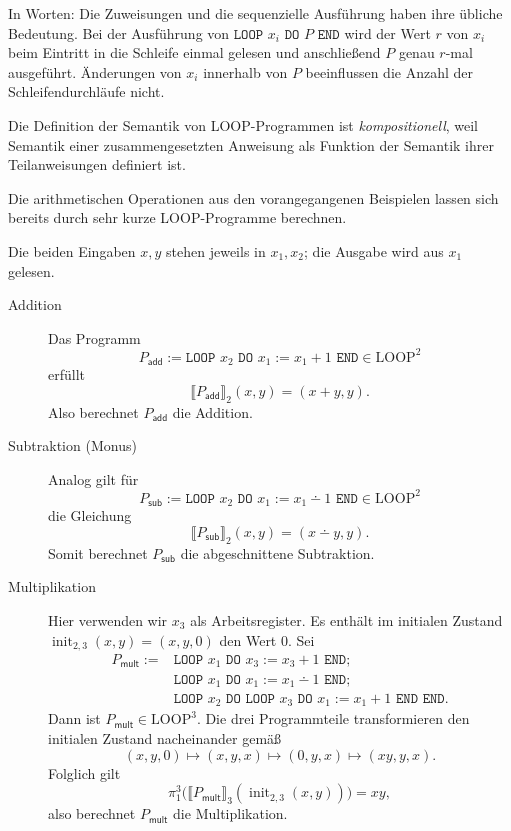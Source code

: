In Worten: Die Zuweisungen und die sequenzielle Ausführung haben ihre übliche
Bedeutung. Bei der Ausführung von
$\texttt{LOOP }x_i\texttt{ DO }P\texttt{ END}$ wird der Wert $r$ von $x_i$
beim Eintritt in die Schleife einmal gelesen und anschließend $P$ genau
$r$-mal ausgeführt. Änderungen von $x_i$ innerhalb von $P$ beeinflussen die
Anzahl der Schleifendurchläufe nicht.

Die Definition der Semantik von LOOP-Programmen ist
\emph{kompositionell}, weil Semantik einer zusammengesetzten Anweisung
als Funktion der Semantik ihrer Teilanweisungen definiert ist.

Die arithmetischen Operationen aus den vorangegangenen Beispielen lassen sich
bereits durch sehr kurze LOOP-Programme berechnen.
\begin{Bsp}
  Die beiden Eingaben $x,y$ stehen jeweils in $x_1,x_2$; die Ausgabe wird aus
  $x_1$ gelesen.
  \begin{description}
  \item[Addition]
    Das Programm
    \[
      P_{\mathsf{add}}
      :=\texttt{LOOP }x_2\texttt{ DO }x_1:=x_1+1\texttt{ END}
      \in\mathrm{LOOP}^2
    \]
    erfüllt
    \[
      \llbracket P_{\mathsf{add}}\rrbracket_2(x,y)=(x+y,y).
    \]
    Also berechnet $P_{\mathsf{add}}$ die Addition.

  \item[Subtraktion (Monus)]
    Analog gilt für
    \[
      P_{\mathsf{sub}}
      :=\texttt{LOOP }x_2\texttt{ DO }
        x_1:=x_1\dotminus1\texttt{ END}
      \in\mathrm{LOOP}^2
    \]
    die Gleichung
    \[
      \llbracket P_{\mathsf{sub}}\rrbracket_2(x,y)
      =(x\dotminus y,y).
    \]
    Somit berechnet $P_{\mathsf{sub}}$ die abgeschnittene Subtraktion.

  \item[Multiplikation]
    Hier verwenden wir $x_3$ als Arbeitsregister. Es enthält im initialen
    Zustand $\operatorname{init}_{2,3}(x,y)=(x,y,0)$ den Wert $0$. Sei
    \[
      \begin{aligned}
      P_{\mathsf{mult}}:={}&
        \texttt{LOOP }x_1\texttt{ DO }x_3:=x_3+1\texttt{ END};\\
      & \texttt{LOOP }x_1\texttt{ DO }
          x_1:=x_1\dotminus1\texttt{ END};\\
      & \texttt{LOOP }x_2\texttt{ DO LOOP }x_3\texttt{ DO }
          x_1:=x_1+1\texttt{ END END}.
      \end{aligned}
    \]
    Dann ist $P_{\mathsf{mult}}\in\mathrm{LOOP}^3$. Die drei Programmteile
    transformieren den initialen Zustand nacheinander gemäß
    \[
      (x,y,0)\longmapsto(x,y,x)\longmapsto(0,y,x)
      \longmapsto(xy,y,x).
    \]
    Folglich gilt
    \[
      \pi_1^3\bigl(
        \llbracket P_{\mathsf{mult}}\rrbracket_3
        (\operatorname{init}_{2,3}(x,y))\bigr)=xy,
    \]
    also berechnet $P_{\mathsf{mult}}$ die Multiplikation.
  \end{description}
\end{Bsp}

